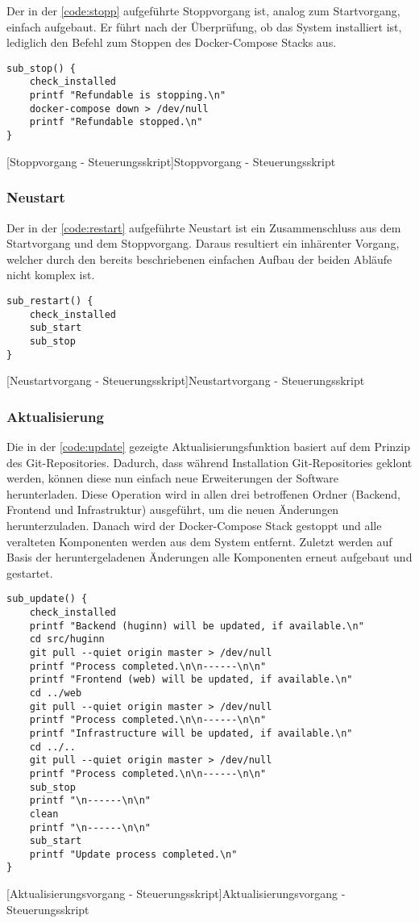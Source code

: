 Der in der \autoref{code:stopp} aufgeführte Stoppvorgang ist, analog zum Startvorgang, einfach aufgebaut. Er führt nach der Überprüfung, ob das System installiert ist, lediglich den Befehl zum Stoppen des Docker-Compose Stacks aus.

\begin{verbatim}
sub_stop() {
	check_installed
	printf "Refundable is stopping.\n"
	docker-compose down > /dev/null
	printf "Refundable stopped.\n"
}
\end{verbatim}
[Stoppvorgang - Steuerungsskript]{Stoppvorgang - Steuerungsskript}
\label{code:stopp}

\subsubsection{Neustart}

Der in der \autoref{code:restart} aufgeführte Neustart ist ein Zusammenschluss aus dem Startvorgang und dem Stoppvorgang. Daraus resultiert ein inhärenter Vorgang, welcher durch den bereits beschriebenen einfachen Aufbau der beiden Abläufe nicht komplex ist.

\begin{verbatim}
sub_restart() {
	check_installed
	sub_start
	sub_stop
}
\end{verbatim}
[Neustartvorgang - Steuerungsskript]{Neustartvorgang - Steuerungsskript}
\label{code:restart}

\subsubsection{Aktualisierung}
Die in der \autoref{code:update} gezeigte Aktualisierungsfunktion basiert auf dem Prinzip des Git-Repositories. Dadurch, dass während Installation Git-Repositories geklont werden, können diese nun einfach neue Erweiterungen der Software herunterladen. Diese Operation wird in allen drei betroffenen Ordner (Backend, Frontend und Infrastruktur) ausgeführt, um die neuen Änderungen herunterzuladen. Danach wird der Docker-Compose Stack gestoppt und alle veralteten Komponenten werden aus dem System entfernt. Zuletzt werden auf Basis der heruntergeladenen Änderungen alle Komponenten erneut aufgebaut und gestartet.

\newpage

\begin{verbatim}
sub_update() {
	check_installed
	printf "Backend (huginn) will be updated, if available.\n"
	cd src/huginn
	git pull --quiet origin master > /dev/null
	printf "Process completed.\n\n------\n\n"
	printf "Frontend (web) will be updated, if available.\n"
	cd ../web
	git pull --quiet origin master > /dev/null
	printf "Process completed.\n\n------\n\n"
	printf "Infrastructure will be updated, if available.\n"
	cd ../..
	git pull --quiet origin master > /dev/null
	printf "Process completed.\n\n------\n\n"
	sub_stop
	printf "\n------\n\n"
	clean
	printf "\n------\n\n"
	sub_start
	printf "Update process completed.\n"
}
\end{verbatim}
[Aktualisierungsvorgang - Steuerungsskript]{Aktualisierungsvorgang - Steuerungsskript}
\label{code:update}

